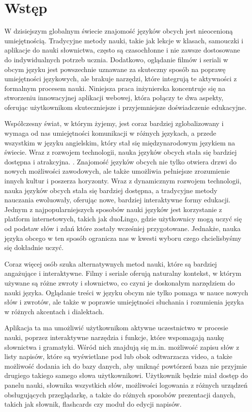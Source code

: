 \section{Wstęp}
W dzisiejszym globalnym świecie znajomość języków obcych jest nieocenioną umiejętnością. Tradycyjne metody nauki, takie jak lekcje w klasach, samouczki i aplikacje do nauki słownictwa, często są czasochłonne i nie zawsze dostosowane do indywidualnych potrzeb ucznia. Dodatkowo, oglądanie filmów i seriali w obcym języku jest powszechnie uznawane za skuteczny sposób na poprawę umiejętności językowych, ale brakuje narzędzi, które integrują te aktywności z formalnym procesem nauki. Niniejsza praca inżynierska koncentruje się na stworzeniu innowacyjnej aplikacji webowej, która połączy te dwa aspekty, oferując użytkownikom skuteczniejsze i przyjemniejsze doświadczenie edukacyjne.

Współczesny świat, w którym żyjemy, jest coraz bardziej zglobalizowany i wymaga od nas umiejętności komunikacji w różnych językach, a przede wszystkim w języku angielskim, który stał się międzynarodowym językiem na świecie. Wraz z rozwojem technologii, nauka języków obcych stała się bardziej dostępna i atrakcyjna. . Znajomość języków obcych nie tylko otwiera drzwi do nowych możliwości zawodowych, ale także umożliwia pełniejsze zrozumienie innych kultur i poszerza horyzonty. Wraz z dynamicznym rozwojem technologii, nauka języków obcych stała się bardziej dostępna, a tradycyjne metody nauczania ewoluowały, oferując nowe, bardziej interaktywne formy edukacji. Jednym z najpopularniejszych sposobów nauki języków jest korzystanie z platform internetowych, takich jak duoLingo, gdzie użytkownicy mogą uczyć się od podstaw słów i zdań które zostały wcześniej przygotowane. Jednakże, nauka języka obcego w ten sposób ogranicza nas w kwesti wyboru czego chcielisbyśmy się dokładnie uczyć.

Coraz więcej osób szuka alternatywnych metod nauki, które są bardziej angażujące i interaktywne. Filmy i seriale oferują naturalny kontekst, w którym używane są różne zwroty i słownictwo, co czyni je doskonałym narzędziem do nauki języka. Oglądanie treści w języku obcym nie tylko pomaga w nauce nowych słów i zwrotów, ale także w poprawie umiejętności słuchania i rozumienia języka w różnych akcentach i dialektach.

Aplikacja ta ma umożliwić użytkownikom aktywne uczestnictwo w procesie nauki, poprzez interaktywne narzędzia i funkcje, które wspomagają naukę słownictwa i gramatyki. Wśród nich znajdują się m.in. możliwość zapisu słów z listy napisów, które są wyświetlane pod lub obok odtwarzacza video, a także możliwość dodania ich do bazy danych, aby uniknąć powtórzeń baza nie przyjmie drugiego takiego samego słowa użytkownikowi. Użytkownik będzie miał dostęp do panelu nauki, słownika wszystkich słów, możliwości logowania z różnych urządzeń obsługujących przeglądarkę, a także do różnych sposobów prezentacji danych, takich jak słownik, flashcards czy moduł do edycji napisów.

